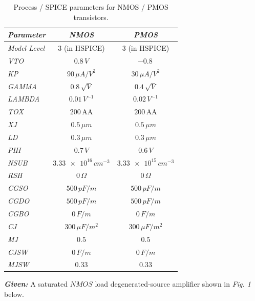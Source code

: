 \documentclass[12pt, fleqn]{article}
\begin{document}
\begin{table}[H]
\centering
\setlength{\tabcolsep}{20pt}
\renewcommand{\arraystretch}{1.5}
\begin{tabular}{|l|c|c|}
    \hline
    \textbf{\textit{\textbf{Parameter}}}  &  \textit{\textbf{NMOS}} & \textit{\textbf{PMOS}}\\
    \hline
    \textit{Model Level} & 3 (in HSPICE) & 3 (in HSPICE)\\
    \hline
    \textit{VTO} & $0.8\,V$ & $-0.8\,$\\
    \hline
    \textit{KP} & $90\,\mu A/V^2$ & $30\,\mu A/V^2$\\
    \hline
    \textit{GAMMA} & $0.8\,\sqrt{V}$ & $0.4\,\sqrt{V}$\\
    \hline
    \textit{LAMBDA} & $0.01\,V^{-1}$ & $0.02\,V^{-1}$\\
    \hline
    \textit{TOX} & $200\,\text{AA}$ & $200\,\text{AA}$\\
    \hline
    \textit{XJ} & $0.5\,\mu m$ & $0.5\,\mu m$\\
    \hline
    \textit{LD} & $0.3\,\mu m$ & $0.3\,\mu m$\\
    \hline
    \textit{PHI} & $0.7\,V$ & $0.6\,V$\\
    \hline
    \textit{NSUB} & $\num{3.33e16}\,cm^{-3}$ & $\num{3.33e15}\,cm^{-3}$\\
    \hline
    \textit{RSH} & $0\,\Omega$ & $0\,\Omega$\\
    \hline
    \textit{CGSO} & $500\,pF/m$ & $500\,pF/m$\\
    \hline
    \textit{CGDO} & $500\,pF/m$ & $500\,pF/m$\\
    \hline
    \textit{CGBO} & $0\,F/m$ & $0\,F/m$\\
    \hline
    \textit{CJ} & $300\,\mu F/m^2$ & $300\,\mu F/m^2$\\
    \hline
    \textit{MJ} & $0.5$ & $0.5$\\
    \hline
    \textit{CJSW} & $0\,F/m$ & $0\,F/m$\\
    \hline
    \textit{MJSW} & $0.33$ & $0.33$\\
    \hline
\end{tabular}
\caption{Process / SPICE parameters for NMOS / PMOS transistors.
\label{tab:proc_param}} 
\end{table}

\newpage\noindent
\textbf{\emph{Given: }} A saturated $NMOS$ load degenerated-source amplifier shown in \textit{Fig. 1} below.
\end{document}
